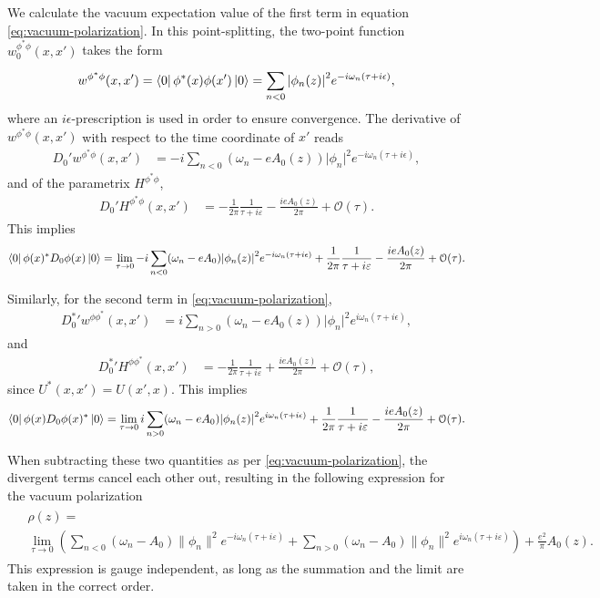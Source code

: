 We calculate the vacuum expectation value of the first term in equation \eqref{eq:vacuum-polarization}.  In this point-splitting, the two-point function  $w_0^{\phi^*\phi }(x, x')$ takes the form
	\begin{align}
		w^{\phi^* \phi}(x, x') = \bra{0}\phi^*(x) \phi(x')\ket{0} = \sum_{n<0}^{} \abs{\phi_n(z)}^2 e^{-i \omega_n \left( \tau + i\epsilon \right) },
	\end{align}
where an $i \epsilon$-prescription is used in order to ensure convergence. The derivative of $w^{\phi^* \phi}(x, x')$ with respect to the time coordinate of $x'$ reads
\begin{align}
	D_0'w^{\phi^* \phi}(x, x') &= -i \sum_{n<0} (\omega_n - eA_0(z))\lvert \phi_n \rvert ^2 e^{-i\omega_n (\tau+i\epsilon)},
\end{align}
and of the parametrix $H^{\phi^* \phi}$,
\begin{align}
	D_0' H^{\phi^*\phi}(x, x') &= -\frac{1}{2\pi}\frac{1}{\tau + i\varepsilon} - \frac{ieA_0(z) }{2\pi} + \mathcal{O}(\tau).
\end{align}
This implies 
\begin{align}
\bra{0}  \phi(x)^* D_0\phi(x)\ket{0}  = \lim_{\tau \to 0} 
 -i\sum_{n<0}^{} (\omega_n - eA_0)\abs{\phi_n(z)}^2 e^{-i \omega_n \left( \tau + i\epsilon \right) }
+\frac{1}{2\pi}\frac{1}{\tau + i\varepsilon} - \frac{ieA_0(z) }{2\pi} + \mathcal{O}(\tau).
\end{align}

Similarly, for the second term in \eqref{eq:vacuum-polarization}, 
\begin{align}
	D_0^*'w^{\phi\phi^* }(x, x') &= i \sum_{n>0} (\omega_n - eA_0(z))\lvert \phi_n \rvert ^2 e^{i\omega_n (\tau+i\epsilon)},
\end{align}
and
\begin{align}
	D_0^*' H^{\phi\phi^*}(x, x') &= -\frac{1}{2\pi}\frac{1}{\tau + i\varepsilon} + \frac{ieA_0(z) }{2\pi} + \mathcal{O}(\tau),
\end{align}
since $U^*(x, x') = U(x', x)$.
This implies 
\begin{align}
\bra{0}  \phi(x)D_0\phi(x)^* \ket{0}  = \lim_{\tau \to 0} 
 i\sum_{n>0}^{} (\omega_n - eA_0)\abs{\phi_n(z)}^2 e^{i \omega_n \left( \tau + i\epsilon \right) }
+\frac{1}{2\pi}\frac{1}{\tau + i\varepsilon} - \frac{ieA_0(z) }{2\pi} + \mathcal{O}(\tau).
\end{align}

When subtracting these two quantities as per \eqref{eq:vacuum-polarization}, the divergent terms cancel each other out, resulting in the following expression for the vacuum polarization 
\begin{align}
	\begin{split}
			&\rho(z) =  \\
			&\lim_{\tau \to 0}\left(
			\sum_{n< 0}^{} (\omega_n - A_0) \|\phi_n\|^2 e^{-i \omega_n (\tau + i\varepsilon)}  +
			\sum_{n> 0}^{} (\omega_n - A_0) \|\phi_n\|^2 e^{i \omega_n (\tau + i\varepsilon)}  \right)
			+ \frac{e^2}{\pi} A_0(z).
	\end{split}
	\label{eq:Hadamard-vacuum-polarization}
\end{align}
This expression is gauge independent, as long as the summation and the limit  are taken in the correct order. 

